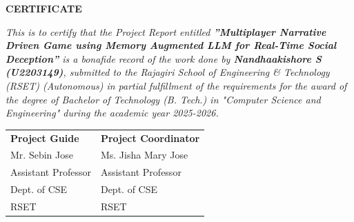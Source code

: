 	\newpage
	\thispagestyle{empty}
	\vspace{1cm}
	\begin{center}
	
		\large \bfseries{\huge{CERTIFICATE}}\\[1cm]
	\end{center}
	
	\renewcommand{\baselinestretch}{1.2}\normalsize
	
	\emph{This is to certify that the Project Report entitled \textbf{”Multiplayer Narrative Driven Game using Memory
Augmented LLM for Real-Time Social Deception”} is a bonafide record of the work done by 
\textbf{Nandhaakishore S (U2203149)},
submitted to the Rajagiri School of Engineering \& Technology (RSET) (Autonomous) in partial fulfillment of the requirements for the award of the degree of Bachelor of Technology (B. Tech.) in "Computer Science and Engineering" during the academic year 2025-2026.}\\[2.5cm]
	
\begin{flushleft}
	
	
	\begin{longtable}{p{10.8cm} p{10.8cm}}
        {\textbf{Project Guide}} &  {\textbf{Project Coordinator}}\\
		{Mr. Sebin Jose} & {Ms. Jisha Mary Jose}\\
		{Assistant Professor} & {Assistant Professor}\\
		{Dept. of CSE} & {Dept. of CSE}\\
		{RSET} & {RSET} \\
		
	\end{longtable}
\end{flushleft}
	
